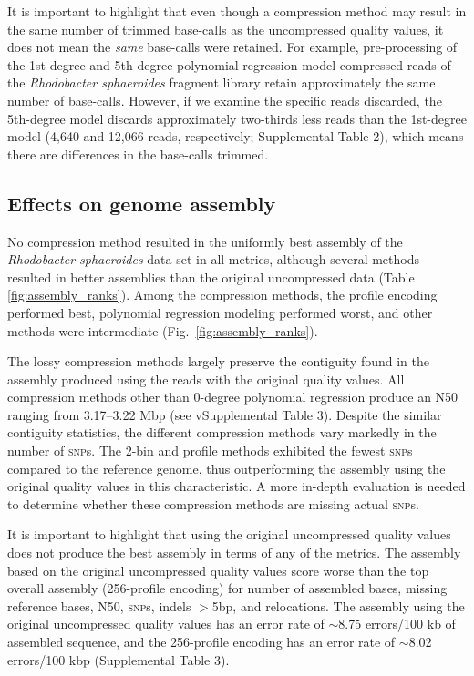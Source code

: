 \documentclass{bmcart}
\begin{document}
It is important to highlight that even though a compression method may
result in the same number of trimmed base-calls as the uncompressed
quality values, it does not mean the \emph{same} base-calls were
retained.  For example, pre-processing of the 1st-degree and
5th-degree polynomial regression model compressed reads of the
\textit{Rhodobacter sphaeroides} fragment library retain approximately
the same number of base-calls. However, if we examine the specific
reads discarded, the 5th-degree model discards approximately
two-thirds less reads than the 1st-degree model (4,640 and 12,066
reads, respectively; Supplemental Table 2), which means there are
differences in the base-calls trimmed.

\subsection*{Effects on genome assembly}

No compression method resulted in the uniformly best assembly of the
\textit{Rhodobacter sphaeroides} data set in all metrics, although
several methods resulted in better assemblies than the original
uncompressed data (Table \ref{fig:assembly_ranks}). Among the
compression methods, the profile encoding performed best, polynomial
regression modeling performed worst, and other methods were
intermediate (Fig.~\ref{fig:assembly_ranks}).

The lossy compression methods largely preserve the contiguity found in
the assembly produced using the reads with the original quality
values. All compression methods other than 0-degree polynomial
regression produce an N50 ranging from 3.17--3.22 Mbp (see
vSupplemental Table 3). Despite the similar contiguity statistics, the
different compression methods vary markedly in the number of
\textsc{snp}s. The 2-bin and profile methods exhibited the fewest
\textsc{snp}s compared to the reference genome, thus outperforming the
assembly using the original quality values in this characteristic. A
more in-depth evaluation is needed to determine whether these
compression methods are missing actual \textsc{snp}s.

It is important to highlight that using the original uncompressed
quality values does not produce the best assembly in terms of any of
the metrics. The assembly based on the original uncompressed quality
values score worse than the top overall assembly (256-profile
encoding) for number of assembled bases, missing reference bases, N50,
\textsc{snp}s, indels $>$5bp, and relocations. The assembly using the
original uncompressed quality values has an error rate of $\sim$8.75
errors/100 kb of assembled sequence, and the 256-profile encoding has
an error rate of $\sim$8.02 errors/100 kbp (Supplemental Table 3).
\end{document}
